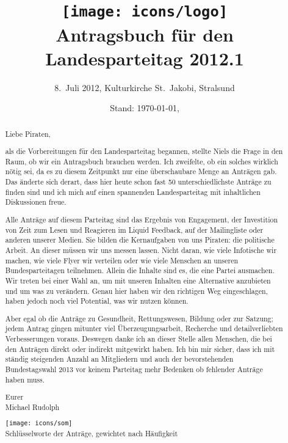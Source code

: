 \documentclass[a4paper,10pt]{scrreprt}
\title{\texttt{[image: icons/logo]}\vspace{2em}\\Antragsbuch für den\\ Landesparteitag 2012.1}
\subtitle{8.\ Juli 2012, Kulturkirche St.\ Jakobi, Stralsund}
\date{Stand: \today, \uhri{}}
\begin{document}
\maketitle

\begin{abstract}
Liebe Piraten,

als die Vorbereitungen für den Landesparteitag begannen, stellte Niels die Frage in den Raum, ob wir ein Antragsbuch brauchen werden. Ich zweifelte, ob ein solches wirklich nötig sei, da es zu diesem Zeitpunkt nur eine überschaubare Menge an Anträgen gab. Das änderte sich derart, dass hier heute schon fast 50 unterschiedlichste Anträge zu finden sind und ich mich auf einen spannenden Landesparteitag mit inhaltlichen Diskussionen freue.

Alle Anträge auf diesem Parteitag sind das Ergebnis von Engagement, der Investition von Zeit zum Lesen und Reagieren im Liquid Feedback, auf der Mailingliste oder anderen unserer Medien. Sie bilden die Kernaufgaben von uns Piraten: die politische Arbeit. An dieser müssen wir uns messen lassen. Nicht daran, wie viele Infotische wir machen, wie viele Flyer wir verteilen oder wie viele Menschen an unseren Bundesparteitagen teilnehmen. Allein die Inhalte sind es, die eine Partei ausmachen. Wir treten bei einer Wahl an, um mit unseren Inhalten eine Alternative anzubieten und um was zu verändern. Genau hier haben wir den richtigen Weg eingeschlagen, haben jedoch noch viel Potential, was wir nutzen können.

Aber egal ob die Anträge zu Gesundheit, Rettungswesen, Bildung oder zur Satzung; jedem Antrag gingen mitunter viel Überzeugungsarbeit, Recherche und detailverliebten Verbesserungen voraus. Deswegen danke ich an dieser Stelle allen Menschen, die bei den Anträgen direkt oder indirekt mitgewirkt haben. Ich bin mir sicher, dass ich mit ständig steigenden Anzahl an Mitgliedern und auch der bevorstehenden Bundestagswahl 2013 vor keinem Parteitag mehr Bedenken ob fehlender Anträge haben muss.

Eurer\\
\quad Michael Rudolph

\vfill
\texttt{[image: icons/som]}\\Schlüsselworte der Anträge, gewichtet nach Häufigkeit
\end{abstract}

\tableofcontents
\printindex*

\newcommand{\LPTprogrammtyp}{}

\end{document}
